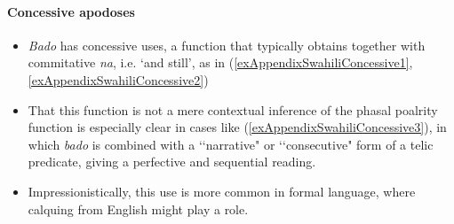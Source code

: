 \paragraph{Concessive apodoses}
\label{appendixSwahiliConcessiveConsequent}
\begin{itemize}
	\sloppy
	\item \textit{Bado} has concessive uses, a function that typically obtains together with commitative \textit{na}, i.e. \lq and still\rq{}, as in (\ref{exAppendixSwahiliConcessive1}, \ref{exAppendixSwahiliConcessive2}) 
	\item That this function is not a mere contextual inference of the phasal poalrity function is especially clear in cases like (\ref{exAppendixSwahiliConcessive3}), in which \textit{bado} is combined with a \lq\lq narrative" or \lq\lq consecutive" form of a telic predicate, giving a perfective and sequential reading.
	\item Impressionistically, this use is more common in formal language, where calquing from English might play a role.
\end{itemize}

